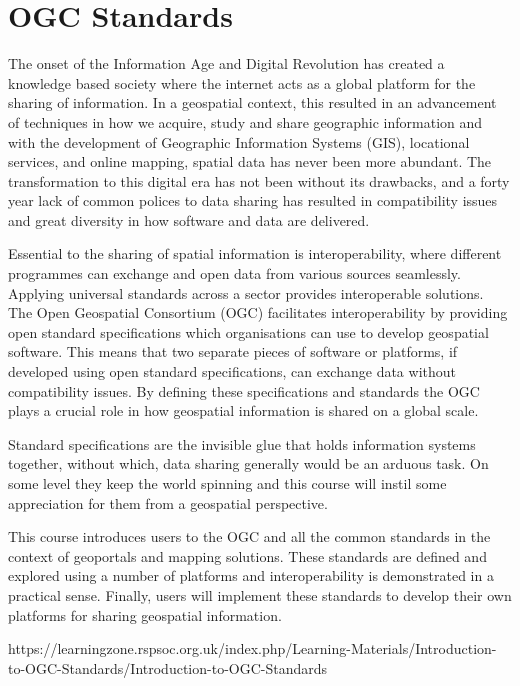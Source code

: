 \documentclass[class=scrbook, crop=false]{standalone}
\begin{document}
    

\section{OGC Standards}
\label{Section::OGC Standards}

The onset of the Information Age and Digital Revolution has created a knowledge based society where the internet acts as a global platform for the sharing of information. In a geospatial context, this resulted in an advancement of techniques in how we acquire, study and share geographic information and with the development of Geographic Information Systems (GIS), locational services, and online mapping, spatial data has never been more abundant. The transformation to this digital era has not been without its drawbacks, and a forty year lack of common polices to data sharing has resulted in compatibility issues and great diversity in how software and data are delivered.

Essential to the sharing of spatial information is interoperability, where different programmes can exchange and open data from various sources seamlessly. Applying universal standards across a sector provides interoperable solutions. The Open Geospatial Consortium (OGC) facilitates interoperability by providing open standard specifications which organisations can use to develop geospatial software. This means that two separate pieces of software or platforms, if developed using open standard specifications, can exchange data without compatibility issues. By defining these specifications and standards the OGC plays a crucial role in how geospatial information is shared on a global scale.

Standard specifications are the invisible glue that holds information systems together, without which, data sharing generally would be an arduous task. On some level they keep the world spinning and this course will instil some appreciation for them from a geospatial perspective.

This course introduces users to the OGC and all the common standards in the context of geoportals and mapping solutions. These standards are defined and explored using a number of platforms and interoperability is demonstrated in a practical sense. Finally, users will implement these standards to develop their own platforms for sharing geospatial information.

https://learningzone.rspsoc.org.uk/index.php/Learning-Materials/Introduction-to-OGC-Standards/Introduction-to-OGC-Standards
\end{document}
